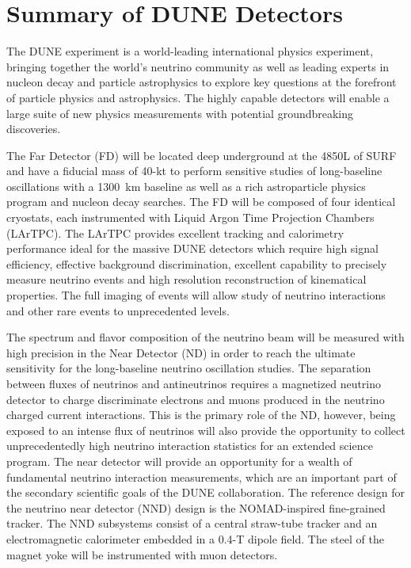 \chapter{Summary of DUNE Detectors}
\label{ch:detectors-summary}

The DUNE experiment is a world-leading international physics
experiment, bringing together the world's neutrino community as well
as leading experts in nucleon decay and particle astrophysics to
explore key questions at the forefront of particle physics and
astrophysics. The highly capable detectors will enable a
large suite of new physics measurements with potential groundbreaking
discoveries.

The Far Detector (FD) will be located deep underground at the 4850L of
SURF and have a fiducial mass of 40-kt to perform sensitive studies of
long-baseline oscillations with a 1300~km baseline as well as a rich
astroparticle physics program and nucleon decay searches. The FD
will be composed of four identical cryostats, each instrumented with
Liquid Argon Time Projection Chambers (LArTPC). The LArTPC provides
excellent tracking and calorimetry performance ideal for the massive
DUNE detectors which require high signal efficiency, effective
background discrimination, excellent capability to precisely measure
neutrino events and high resolution reconstruction of kinematical
properties. The full imaging of events will allow study of neutrino
interactions and other rare events to unprecedented levels.

The spectrum and flavor composition of the neutrino beam will be
measured with high precision in the Near Detector (ND) in order to
reach the ultimate sensitivity for the long-baseline neutrino
oscillation studies.  The separation between fluxes of neutrinos and
antineutrinos requires a magnetized neutrino detector to charge
discriminate electrons and muons produced in the neutrino charged
current interactions.  This is the primary role of the ND, however,
being exposed to an intense flux of neutrinos will also provide the
opportunity to collect unprecedentedly high neutrino
interaction statistics for an extended science program.  The near detector will
provide an opportunity for a wealth of fundamental neutrino
interaction measurements, which are an important part of the secondary
scientific goals of the DUNE collaboration.  The reference design for
the neutrino near detector (NND) design is the NOMAD-inspired
fine-grained tracker. The NND subsystems consist of a central
straw-tube tracker and an electromagnetic calorimeter embedded in a
0.4-T dipole field. The steel of the magnet yoke will be instrumented
with muon detectors.
